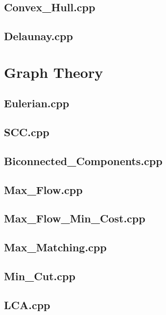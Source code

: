 \subsection{Convex\_Hull.cpp}

\subsection{Delaunay.cpp}

\section{Graph Theory}
\subsection{Eulerian.cpp}

\subsection{SCC.cpp}

\subsection{Biconnected\_Components.cpp}

\subsection{Max\_Flow.cpp}

\subsection{Max\_Flow\_Min\_Cost.cpp}

\subsection{Max\_Matching.cpp}

\subsection{Min\_Cut.cpp}

\subsection{LCA.cpp}

